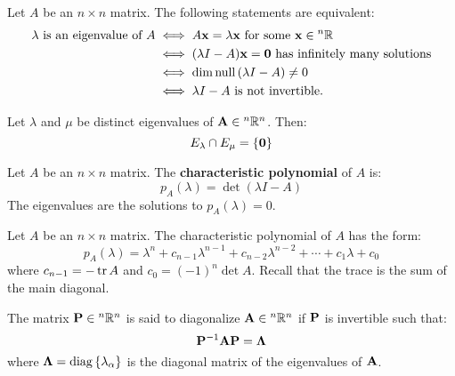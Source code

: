 \documentclass{article}
\begin{document}
    Let $A$ be an $n\times n$ matrix. The following statements are equivalent:
    \begin{align*}
        \lambda\text{ is an eigenvalue of } A &\iff A\mathbf{x} = \lambda \mathbf{x}\text{ for some } \mathbf{x} \in {^n}\mathbb{R} \\ 
        &\iff (\lambda I - A)\mathbf{x} = \mathbf{0} \text{ has infinitely many solutions} \\ 
        &\iff \dim\mathrm{null}\,(\lambda I - A) \neq 0 \\ 
        &\iff \lambda I - A \text{ is not invertible.}
    \end{align*}
    \begin{proposition}
        Let $\lambda$ and $\mu$ be distinct eigenvalues of $\mathbf{A} \in {^n}\mathbb{R}^n$. Then:
        \begin{equation}
            E_\lambda \cap E_\mu = \{\mathbf{0}\}
        \end{equation}
    \end{proposition}
    \begin{definition}
        Let $A$ be an $n\times n$ matrix. The \textbf{characteristic polynomial} of $A$ is:
        \begin{equation}
            p_A(\lambda) = \det(\lambda I - A)
        \end{equation}
        The eigenvalues are the solutions to $p_A(\lambda)=0$.
    \end{definition}
    \begin{theorem}
        Let $A$ be an $n\times n$ matrix. The characteristic polynomial of $A$ has the form:
        \begin{equation}
            p_A(\lambda) = \lambda^n + c_{n-1}\lambda^{n-1} + c_{n-2}\lambda^{n-2} + \cdots + c_1\lambda + c_0
        \end{equation}
        where $c_{n-1} = -\tr A$ and $c_0 = (-1)^n \det A$. Recall that the trace is the sum of the main diagonal.
    \end{theorem}
    \begin{definition}
        The matrix $\mathbf{P} \in {^n}\mathbb{R}^n$ is said to diagonalize $\mathbf{A} \in {^n}\mathbb{R}^n$ if $\mathbf{P}$ is invertible such that:
        \begin{equation}
            \mathbf{P}^{-1}\mathbf{A}\mathbf{P} = \mathbf{\Lambda}
        \end{equation}
        where $\mathbf{\Lambda} = \mathrm{diag}\,\{\lambda_\alpha\}$ is the diagonal matrix of the eigenvalues of $\mathbf{A}$.
    \end{definition}
\end{document}
